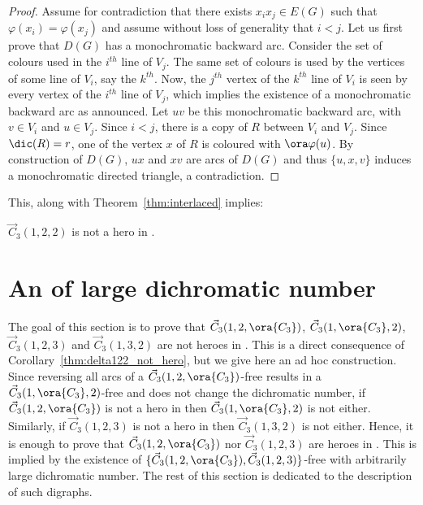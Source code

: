 \begin{proof}
Assume for contradiction that there exists  $x_ix_j \in E(G)$ such that $\varphi(x_i) = \varphi(x_j)$ and assume without loss of generality that $i<j$. Let us first prove that $D(G)$ has a monochromatic backward arc. 
Consider the set of colours used in the $i^{th}$ line of $V_j$. The same set of colours is used by the vertices of some line of $V_i$, say the $k^{th}$. Now, the $j^{th}$ vertex of the $k^{th}$ line of $V_i$ is seen by every vertex of the $i^{th}$ line of $V_j$, which implies the existence of a monochromatic backward arc as announced.   
Let $uv$ be this monochromatic backward arc, with $v \in V_i$ and $u \in V_j$. Since $i<j$, there is a copy of $R$ between $V_i$ and $V_j$. Since $\dic(R) = r$, one of the vertex $x$ of $R$ is coloured with $\ora \varphi(u)$. By construction of $D(G)$, $ux$ and $xv$ are arcs of $D(G)$ and thus $\{u,x, v\}$ induces a monochromatic directed triangle, a contradiction.   

\end{proof}

This, along with Theorem~\ref{thm:interlaced} implies:

\begin{corollary}\label{thm:delta122_not_hero}
$\vec C_{3}(1,2,2)$ is not a hero in \omgs.
\end{corollary}

\section{An \omg of large dichromatic number}\label{sec:counter_exemple}

The goal of this section is to prove that $\vec C_{3}(1,2, \ora{C_3})$, $\vec C_{3}(1, \ora{C_3}, 2)$, $\vec C_{3}(1,2, 3)$ and $\vec C_{3}(1,3, 2)$ are not heroes in \omgs. This is a direct consequence of Corollary~\ref{thm:delta122_not_hero}, but we give here an ad hoc construction.
Since  reversing all arcs of a $\vec C_{3}(1,2, \ora{C_3})$-free \omg results in a $\vec C_{3}(1, \ora{C_3}, 2)$-free \omg and does not change the dichromatic number, if $\vec C_{3}(1,2, \ora{C_3})$ is not a hero in \omgs then $\vec C_{3}(1,\ora{C_3}, 2)$ is not either. 
Similarly, if $\vec C_{3}(1, 2, 3)$ is not a hero in \omgs then  $\vec C_{3}(1, 3, 2)$ is not either. 
Hence, it is enough to prove that  $\vec C_{3}(1,2, \ora{C_3})$ nor $\vec C_{3}(1,2, 3)$ are heroes in \omgs. This is implied by the existence of  $\{\vec C_{3}(1, 2, \ora{C_3}), \vec C_{3}(1,2, 3)\}$-free \omgs with arbitrarily large dichromatic number. The rest of this section is dedicated to the description of such digraphs. \smallskip

